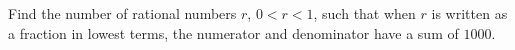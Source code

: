 Find the number of rational numbers $r$, $0<r<1$, such that when $r$ is written as a fraction in lowest terms, the numerator and denominator have a sum of $1000$.